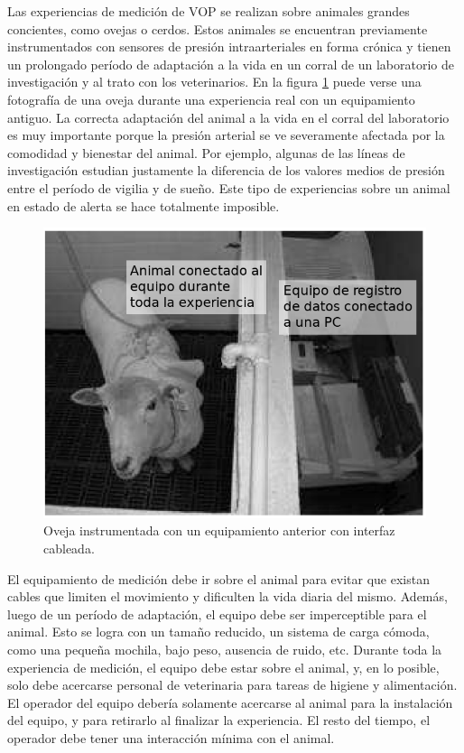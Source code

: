 Las experiencias de medición de VOP se realizan sobre animales grandes concientes, como ovejas o cerdos. Estos animales se encuentran previamente instrumentados con sensores de presión intraarteriales en forma crónica y tienen un prolongado período de adaptación a la vida en un corral de un laboratorio de investigación y al trato con los veterinarios. En la figura \ref{fig:oveja} puede verse una fotografía de una oveja durante una experiencia real con un equipamiento antiguo. La correcta adaptación del animal a la vida en el corral del laboratorio es muy importante porque la presión arterial se ve severamente afectada por la comodidad y bienestar del animal. Por ejemplo, algunas de las líneas de investigación estudian justamente la diferencia de los valores medios de presión entre el período de vigilia y de sueño. Este tipo de experiencias sobre un animal en estado de alerta se hace totalmente imposible.


\begin{figure}[!htbp]
	\centering
	
	\begin{minipage}{.65\textwidth}
		\includegraphics[width=\textwidth]{./Figures/oveja.png}		
	\end{minipage}		
	
	\caption{Oveja instrumentada con un equipamiento anterior con interfaz cableada.}
	\label{fig:oveja}
\end{figure}

El equipamiento de medición debe ir sobre el animal para evitar que existan cables que limiten el movimiento y dificulten la vida diaria del mismo. Además, luego de un período de adaptación, el equipo debe ser imperceptible para el animal. Esto se logra con un tamaño reducido, un sistema de carga cómoda, como una pequeña mochila, bajo peso, ausencia de ruido, etc. Durante toda la experiencia de medición, el equipo debe estar sobre el animal, y, en lo posible, solo debe acercarse personal de veterinaria para tareas de higiene y alimentación. El operador del equipo debería solamente acercarse al animal para la instalación del equipo, y para retirarlo al finalizar la experiencia. El resto del tiempo, el operador debe tener una interacción mínima con el animal.


